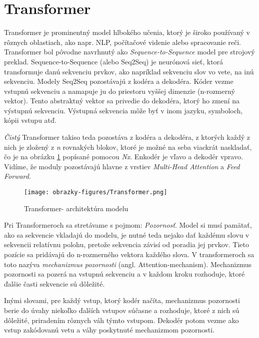 \section{Transformer}

Transformer \cite{Vaswani:2017} je prominentný model hlbokého učenia, ktorý je široko používaný v rôznych oblastiach, ako napr. NLP, počítačové videnie alebo spracovanie reči.
Transformer bol pôvodne navrhnutý ako \textit{Sequence-to-Sequence} model pre strojový preklad. Sequence-to-Sequence (alebo Seq2Seq) je neurónová sieť, ktorá transformuje danú sekvenciu prvkov, ako napríklad sekvenciu slov vo vete, na inú sekvenciu. Modely Seq2Seq pozostávajú z kodéra a dekodéra. Kóder vezme vstupnú sekvenciu a namapuje ju do priestoru vyššej dimenzie (n-rozmerný vektor). Tento abstraktný vektor sa privedie do dekodéra, ktorý ho zmení na výstupnú sekvenciu. Výstupná sekvencia môže byť v inom jazyku, symboloch, kópii vstupu atď.

\textit{Čistý} Transformer takiso teda pozostáva z kodéra a dekodéra, z ktorých každý z nich je zložený z \textit{n} rovnakých blokov, ktoré je možné na seba viackrát naskladať, čo je na obrázku \ref{transformer} popísané pomocou \textit{Nx}. Enkodér je vľavo a dekodér vpravo. Vidíme, že moduly pozostávajú hlavne z vrstiev \textit{Multi-Head Attention} a \textit{Feed Forward}.

\begin{figure}[ht!]
	\centering
	\texttt{[image: obrazky-figures/Transformer.png]}
	\caption{Transformer- architektúra modelu \cite{Vaswani:2017}}
	\label{transformer}
\end{figure}

Pri Transformeroch sa stretávame s pojmom: \textit{Pozornosť}. Model si musí pamätať, ako sa sekvencie vkladajú do modelu, je nutné teda nejako dať každému slovu v sekvencii relatívnu polohu, pretože sekvencia závisí od poradia jej prvkov. Tieto pozície sa pridávajú do n-rozmerného vektora každého slova. V transformeroch sa toto nazýva \textit{mechanizmus pozornosti} (angl. Attention-mechanism). Mechanizmus pozornosti sa pozerá na vstupnú sekvenciu a v každom kroku rozhoduje, ktoré ďalšie časti sekvencie sú dôležité.

Inými slovami, pre každý vstup, ktorý kodér načíta, mechanizmus pozornosti berie do úvahy niekoľko ďalších vstupov súčasne a rozhoduje, ktoré z nich sú dôležité, priradením rôznych váh týmto vstupom. Dekodér potom vezme ako vstup zakódovanú vetu a váhy poskytnuté mechanizmom pozornosti.

